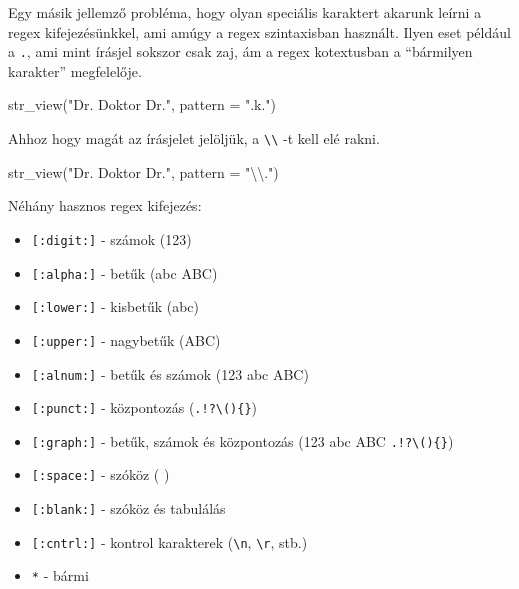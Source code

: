 \documentclass[
]{book}
\newenvironment{Shaded}{\begin{snugshade}}{\end{snugshade}}
\newcommand{\AttributeTok}[1]{\textcolor[rgb]{0.77,0.63,0.00}{#1}}
\newcommand{\FunctionTok}[1]{\textcolor[rgb]{0.00,0.00,0.00}{#1}}
\newcommand{\NormalTok}[1]{#1}
\newcommand{\SpecialCharTok}[1]{\textcolor[rgb]{0.00,0.00,0.00}{#1}}
\newcommand{\StringTok}[1]{\textcolor[rgb]{0.31,0.60,0.02}{#1}}
\providecommand{\tightlist}{%
  \setlength{\itemsep}{0pt}\setlength{\parskip}{0pt}}
\begin{document}
Egy másik jellemző probléma, hogy olyan speciális karaktert akarunk
leírni a regex kifejezésünkkel, ami amúgy a regex szintaxisban használt.
Ilyen eset például a \texttt{.}, ami mint írásjel sokszor csak zaj, ám a
regex kotextusban a ``bármilyen karakter'' megfelelője.

\begin{Shaded}
\begin{Highlighting}[]
\FunctionTok{str\_view}\NormalTok{(}\StringTok{"Dr. Doktor Dr."}\NormalTok{, }\AttributeTok{pattern =} \StringTok{".k."}\NormalTok{)}
\end{Highlighting}
\end{Shaded}

Ahhoz hogy magát az írásjelet jelöljük, a
\texttt{\textbackslash{}\textbackslash{}} -t kell elé rakni.

\begin{Shaded}
\begin{Highlighting}[]
\FunctionTok{str\_view}\NormalTok{(}\StringTok{"Dr. Doktor Dr."}\NormalTok{, }\AttributeTok{pattern =} \StringTok{"}\SpecialCharTok{\textbackslash{}\textbackslash{}}\StringTok{."}\NormalTok{)}
\end{Highlighting}
\end{Shaded}

Néhány hasznos regex kifejezés:

\begin{itemize}
\tightlist
\item
  \texttt{{[}:digit:{]}} - számok (123)
\item
  \texttt{{[}:alpha:{]}} - betűk (abc ABC)
\item
  \texttt{{[}:lower:{]}} - kisbetűk (abc)
\item
  \texttt{{[}:upper:{]}} - nagybetűk (ABC)
\item
  \texttt{{[}:alnum:{]}} - betűk és számok (123 abc ABC)
\item
  \texttt{{[}:punct:{]}} - központozás
  (\texttt{.!?\textbackslash{}()\{\}})
\item
  \texttt{{[}:graph:{]}} - betűk, számok és központozás (123 abc ABC
  \texttt{.!?\textbackslash{}()\{\}})
\item
  \texttt{{[}:space:{]}} - szóköz ( )
\item
  \texttt{{[}:blank:{]}} - szóköz és tabulálás
\item
  \texttt{{[}:cntrl:{]}} - kontrol karakterek
  (\texttt{\textbackslash{}n}, \texttt{\textbackslash{}r}, stb.)
\item
  \texttt{*} - bármi
\end{itemize}
\end{document}
